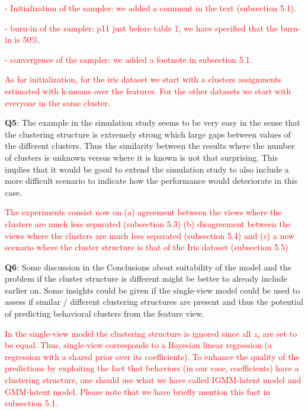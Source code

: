 \documentclass[]{article}
\newcommand\done[1]{\textcolor{red}{#1}}
\begin{document}
	\done{- Initialization of the sampler: we added a comment in the text (subsection 5.1).}
	
	\done{- burn-in of the sampler: p11 just before table 1, we have specified that the burn-in is 50\%. }
	
	\done{- convergence of the sampler: we added a footnote in subsection 5.1. }
	
	\textcolor{red}{
		As for initialization, for the iris dataset we start with a clusters assignments estimated with k-means over the features. For the other datasets we start with everyone in the same cluster.
	}
	
	\vspace{3mm}
	\textbf{Q5}:
	The example in the simulation study seems to be very easy in the sense that the clustering structure is extremely strong which large gaps between values of the different clusters. Thus the similarity between the results where the number of clusters is unknown versus where it is known is not that surprising. This implies that it would be good to extend the simulation study to also include a more difficult scenario to indicate how the performance would deteriorate in this case.
	
	\done{
		The experiments consist now on (a) agreement between the views where the clusters are much less separated (subsection 5.3) (b) disagreement between the views where the clusters are much less separated (subsection 5.4) and (c) a  new scenario where the cluster structure is that of the Iris dataset (subsection 5.5)}	
	
	\vspace{3mm}
	\textbf{Q6}:
	Some discussion in the Conclusions about suitability of the model and the problem if the cluster structure is different might be better to already include earlier on. Some insights could be given if the single-view model could be used to assess if similar / different clustering structures are present and thus the potential of predicting behavioral clusters from the feature view. 
	
	\done{
		In the single-view model the clustering structure is ignored since all $z_i$ are set to be equal. Thus, single-view corresponds to a Bayesian linear regression (a regression with a shared prior over its coefficients). To enhance the quality of the predictions by exploiting the fact that behaviors (in our case, coefficients) have a clustering structure, one should use what we have called IGMM-latent model and GMM-latent model. Please note that we have briefly mention this fact in subsection 5.1.}
	
\end{document}
